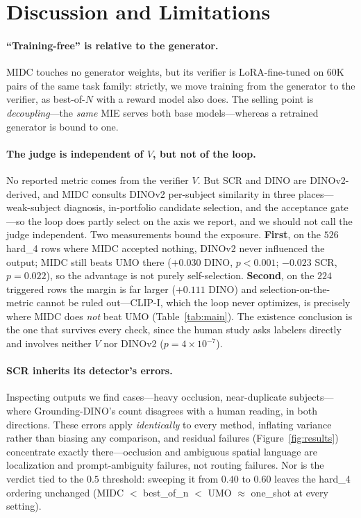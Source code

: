 \documentclass[letterpaper]{article}
\begin{document}
\section{Discussion and Limitations}
\label{sec:limits}

\paragraph{``Training-free'' is relative to the generator.} MIDC touches no generator weights, but its verifier is LoRA-fine-tuned on 60K pairs of the same task family: strictly, we move training from the generator to the verifier, as best-of-$N$ with a reward model also does. The selling point is \emph{decoupling}---the \emph{same} MIE serves both base models---whereas a retrained generator is bound to one.

\paragraph{The judge is independent of $V$, but not of the loop.} No reported metric comes from the verifier $V$. But SCR and DINO are DINOv2-derived, and MIDC consults DINOv2 per-subject similarity in three places---weak-subject diagnosis, in-portfolio candidate selection, and the acceptance gate---so the loop does partly select on the axis we report, and we should not call the judge independent. Two measurements bound the exposure. \textbf{First}, on the $526$ hard\_4 rows where MIDC accepted nothing, DINOv2 never influenced the output; MIDC still beats UMO there ($+0.030$ DINO, $p{<}0.001$; $-0.023$ SCR, $p{=}0.022$), so the advantage is not purely self-selection. \textbf{Second}, on the $224$ triggered rows the margin is far larger ($+0.111$ DINO) and selection-on-the-metric cannot be ruled out---CLIP-I, which the loop never optimizes, is precisely where MIDC does \emph{not} beat UMO (Table~\ref{tab:main}). The existence conclusion is the one that survives every check, since the human study asks labelers directly and involves neither $V$ nor DINOv2 ($p{=}4{\times}10^{-7}$).

\paragraph{SCR inherits its detector's errors.} Inspecting outputs we find cases---heavy occlusion, near-duplicate subjects---where Grounding-DINO's count disagrees with a human reading, in both directions. These errors apply \emph{identically} to every method, inflating variance rather than biasing any comparison, and residual failures (Figure~\ref{fig:results}) concentrate exactly there---occlusion and ambiguous spatial language are localization and prompt-ambiguity failures, not routing failures. Nor is the verdict tied to the $0.5$ threshold: sweeping it from $0.40$ to $0.60$ leaves the hard\_4 ordering unchanged (MIDC $<$ best\_of\_n $<$ UMO $\approx$ one\_shot at every setting).
\end{document}
